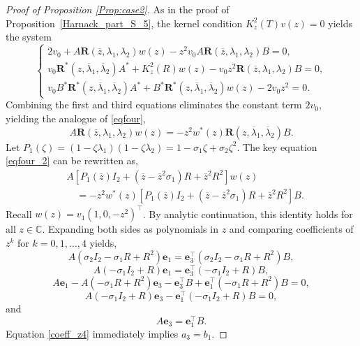 \documentclass[10pt,a4paper]{amsart}
\begin{document}
\begin{proof}[Proof of Proposition \ref{Prop:case2}]
	As in the proof of Proposition~\ref{Harnack_part_S_5}, the kernel condition $K_z^2(T)v(z) = 0$ yields the system
	\begin{equation}\label{system01_2} 
		\begin{cases}
			2v_0 + A \mathbf{R}(\overline{z}, \lambda_1, \lambda_2) w(z) - z^2 v_0 A \mathbf{R}(\overline{z}, \lambda_1, \lambda_2) B = 0,\\
			v_0 \mathbf{R}^*(z, \overline{\lambda}_1, \overline{\lambda}_2) A^* + K_z^2(R) w(z) - v_0 z^2 \mathbf{R}(\overline{z}, \lambda_1, \lambda_2) B = 0,\\
			v_0 B^* \mathbf{R}^*(z, \overline{\lambda}_1, \overline{\lambda}_2) A^* + B^* \mathbf{R}^*(z, \overline{\lambda}_1, \overline{\lambda}_2) w(z) - 2v_0 z^2 = 0.
		\end{cases} 
	\end{equation}
	Combining the first and third equations eliminates the constant term $2v_0$, yielding the analogue of \eqref{eqfour},
	\begin{equation}\label{eqfour_2}
		A \mathbf{R}(\overline{z}, \lambda_1, \lambda_2) w(z) = -z^2 w^*(z) \mathbf{R}(z, \overline{\lambda}_1, \overline{\lambda}_2) B.
	\end{equation}
	Let $P_1(\zeta) = (1 - \zeta\lambda_1)(1 - \zeta\lambda_2) = 1 - \sigma_1\zeta + \sigma_2\zeta^2$. The key equation \eqref{eqfour_2} can be rewritten as,
	\begin{align}\label{poly_identity}
		&A \left[ P_1(\overline{z}) I_2 + (\overline{z} - \overline{z}^2\sigma_1) R + \overline{z}^2 R^2 \right] w(z) \nonumber \\
		&\quad = -z^2 w^*(z)  \left[ P_1(\overline{z}) I_2 + (\overline{z} - \overline{z}^2\sigma_1) R + \overline{z}^2 R^2 \right] B.
	\end{align}
	Recall $w(z) = v_1 (1, 0, -z^2)^\top$. By analytic continuation, this identity holds for all $z \in \mathbb{C}$. Expanding both sides as polynomials in $z$ and comparing coefficients of $z^k$ for $k = 0, 1, \dots, 4$ yields, 
		\begin{equation}\label{coeff_z0}
			A (\sigma_2 I_2 - \sigma_1 R + R^2) \mathbf{e}_1 = \mathbf{e}_3^\top (\sigma_2 I_2 - \sigma_1 R + R^2) B,
		\end{equation} 
		\begin{equation}\label{coeff_z1}
			A (-\sigma_1 I_2 + R) \mathbf{e}_1 = \mathbf{e}_3^\top (-\sigma_1 I_2 + R) B,
		\end{equation}
		\begin{equation}
			 A \mathbf{e}_1 - A(-\sigma_1 R + R^2)\mathbf{e}_3
		 - \mathbf{e}_3^\top B + \mathbf{e}_1^\top (-\sigma_1 R + R^2) B = 0, \label{coeff_z2}
		\end{equation} 
	\begin{equation}
	  A(-\sigma_1 I_2 + R)\mathbf{e}_3 -  \mathbf{e}_1^\top (-\sigma_1 I_2 + R) B = 0, \label{coeff_z3}
		\end{equation} 
and
		\begin{equation}\label{coeff_z4}
			A \mathbf{e}_3 = \mathbf{e}_1^\top B.
		\end{equation}
	Equation \eqref{coeff_z4} immediately implies $a_3 = b_1$.
	

\end{proof}
\end{document}
